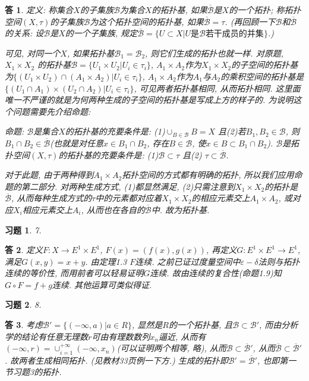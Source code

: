 \documentclass{ctexart}%
\newtheorem*{exercise}{习题}
\newtheorem*{solution}{答}
\theoremstyle{definition}
\theoremstyle{remark}
\begin{document}
\begin{solution}
定义: 称集合$X$的子集族$\mathscr{B}$为集合$X$的拓扑基, 如果$\overline{\mathscr{B}}$是$X$的一个拓扑; 称拓扑空间$(X,\tau)$的子集族$\mathscr{B}$为这个拓扑空间的拓扑基, 如果$\overline{\mathscr{B}}=\tau$.
(再回顾一下$\mathscr{B}$和$\overline{\mathscr{B}}$的关系: 设$\mathscr{B}$是$X$的一个子集族, 规定$\overline{\mathscr{B}}=\{U\subset X|U\text{是}\mathscr{B}\text{若干成员的并集}\}$.) 

可见, 对同一个$X$, 如果拓扑基$\mathscr{B}_1=\mathscr{B}_2$, 则它们生成的拓扑也就一样. 对原题, $X_1\times X_2$ 的拓扑基$\mathscr{B}=\{U_1\times U_2| U_i\in \tau_i\}$, $A_1\times A_2$作为$X_1\times X_2$的子空间的拓扑基为$\{(U_1\times U_2)\cap(A_1\times A_2)| U_i\in \tau_i\}$, $A_1\times A_2$作为$A_1$与$A_2$的乘积空间的拓扑基是$\{(U_1\cap A_1)\times (U_2\cap A_2)|U_i\in \tau_i\}$, 可见两者拓扑基相同, 从而拓扑相同. 这里面唯一不严谨的就是为何两种生成的子空间的拓扑基是写成上方的样子的. 为说明这个问题需要先介绍命题:

命题: $\mathscr{B}$是集合$X$的拓扑基的充要条件是: (1)$\cup_{B\in \mathscr{B}}B=X$ 且(2)若$B_1,B_2\in \mathscr{B}$, 则$B_1\cap B_2\in \overline{\mathscr{B}}$(也就是对任意$x\in B_1\cap B_2$, 存在$B\in \mathscr{B}$, 使$x\in B\subset B_1\cap B_2$). $\mathscr{B}$是拓扑空间$(X,\tau)$的拓扑基的充要条件是: (1)$\mathscr{B}\subset \tau$ 且(2) $\tau\subset \overline{\mathscr{B}}$. 

对于此题, 由于两种得到$A_1\times A_2$拓扑空间的方式都有明确的拓扑, 所以我们应用命题的第二部分. 对两种生成方式, (1)都显然满足, (2)只需注意到$X_1\times X_2$的拓扑是 $\overline{\mathscr{B}}$, 从而每种生成方式的$\tau$中的元素都对应着$X_1\times X_2$的相应元素交上$A_1\times A_2$, 或对应$X_i$相应元素交上$A_i$, 从而也在各自的$\overline{\mathscr{B}}$中. 故为拓扑基. 
\end{solution}

\begin{exercise}7.
\end{exercise}
\begin{solution}定义$F:X\rightarrow E^1\times E^1$, $F(x)=(f(x),g(x))$, 再定义$G:E^1\times E^1\rightarrow E^1$, 满足$G(x,y)=x+y$. 由定理1.3 $F$连续. 之前已证过度量空间中$\varepsilon-\delta$法则与拓扑连续的等价性, 而用前者可以轻易证明$G$连续. 故由连续的复合性(命题1.9)知$G\circ F= f+g$连续. 其他运算可类似得证. 
\end{solution}

\begin{exercise}8.
\end{exercise}
\begin{solution}
考虑$\mathscr{B}'=\{(-\infty, a)|a\in R\}$, 显然是$R$的一个拓扑基, 且$\mathscr{B}\subset\mathscr{B}'$, 而由分析学的结论有任意无理数$r$可由有理数数列$x_n$逼近, 从而有 $(-\infty,r)=\cup_{i=1}^{+\infty}(-\infty, x_n)$(可以证明两个相等, 略), 从而$\mathscr{B}\subset \overline{\mathscr{B}}'$, 从而$\overline{\mathscr{B}}\subset \overline{\mathscr{B}}'$. 故两者生成相同拓扑. (见教材33页例一下方.)  生成的拓扑即$\mathscr{B}'=\overline{\mathscr{B}}'$, 也即第一节习题3的拓扑. 
\end{solution}
\end{document}

